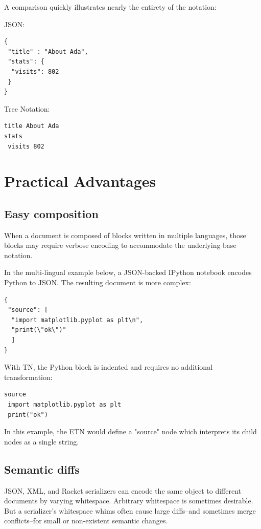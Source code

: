 \documentclass[journal]{IEEEtran}
\begin{document}
A comparison quickly illustrates nearly the entirety of the notation:

JSON:

\begin{lstlisting}
{
 "title" : "About Ada",
 "stats": {
  "visits": 802
 }
}
\end{lstlisting}

Tree Notation:

\begin{lstlisting}
title About Ada
stats
 visits 802
\end{lstlisting}

\section{Practical Advantages}

\subsection{Easy composition}

When a document is composed of blocks written in multiple languages, those blocks may require verbose encoding to accommodate the underlying base notation.

In the multi-lingual example below, a JSON-backed IPython notebook encodes Python to JSON. The resulting document is more complex:

\begin{lstlisting}
{
 "source": [
  "import matplotlib.pyplot as plt\n",
  "print(\"ok\")"
  ]
}
\end{lstlisting}

With TN, the Python block is indented and requires no additional transformation:

\begin{lstlisting}
source
 import matplotlib.pyplot as plt
 print("ok")
\end{lstlisting}

In this example, the ETN would define a "source" node which interprets its child nodes as a single string.

\subsection{Semantic diffs}

JSON, XML, and Racket serializers can encode the same object to different documents by varying whitespace. Arbitrary whitespace is sometimes desirable. But a serializer's whitespace whims often cause large diffs--and sometimes merge conflicts--for small or non-existent semantic changes.
\end{document}
